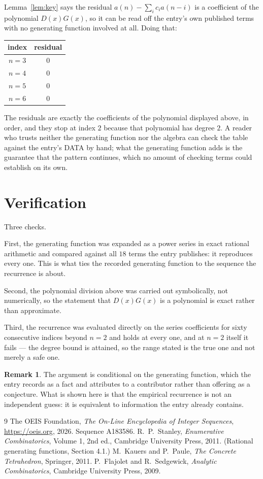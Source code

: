 \documentclass[11pt,a4paper]{article}
\theoremstyle{plain}
\theoremstyle{definition}
\newtheorem{remark}[theorem]{Remark}
\begin{document}
Lemma~\ref{lem:key} says the residual $a(n)-\sum_ic_ia(n-i)$ is a coefficient of the
polynomial $D(x)G(x)$, so it can be read off the entry's own published terms with no
generating function involved at all. Doing that:
\begin{center}
\begin{tabular}{cc}
index & residual \\ \hline
$n=3$ & $0$ \\
$n=4$ & $0$ \\
$n=5$ & $0$ \\
$n=6$ & $0$
\end{tabular}
\end{center}
The residuals are exactly the coefficients of the polynomial displayed above, in order, and
they stop at index $2$ because that polynomial has degree $2$. A reader who trusts
neither the generating function nor the algebra can check the table against the entry's DATA
by hand; what the generating function adds is the guarantee that the pattern continues, which
no amount of checking terms could establish on its own.

\section{Verification}

Three checks.

First, the generating function was expanded as a power series in exact rational arithmetic and
compared against all $18$ terms the entry publishes: it reproduces every one. This is
what ties the recorded generating function to the sequence the recurrence is about.

Second, the polynomial division above was carried out symbolically, not numerically, so the
statement that $D(x)G(x)$ is a polynomial is exact rather than approximate.

Third, the recurrence was evaluated directly on the series coefficients for sixty consecutive
indices beyond $n=2$ and holds at every one, and at $n=2$ itself it fails --- the
degree bound is attained, so the range stated is the true one and not merely a safe one.

\begin{remark}
The argument is conditional on the generating function, which the entry records as a fact and
attributes to a contributor rather than offering as a conjecture. What is shown here is that
the empirical recurrence is not an independent guess: it is equivalent to information the
entry already contains.
\end{remark}

\begin{thebibliography}{9}
 The OEIS Foundation, \emph{The On-Line Encyclopedia of Integer
Sequences}, \url{https://oeis.org}, 2026. Sequence A183586.
 R.~P.~Stanley, \emph{Enumerative Combinatorics}, Volume 1, 2nd ed.,
Cambridge University Press, 2011. (Rational generating functions, Section 4.1.)
 M.~Kauers and P.~Paule, \emph{The Concrete Tetrahedron}, Springer, 2011.
 P.~Flajolet and R.~Sedgewick, \emph{Analytic Combinatorics}, Cambridge
University Press, 2009.
\end{thebibliography}
\end{document}
